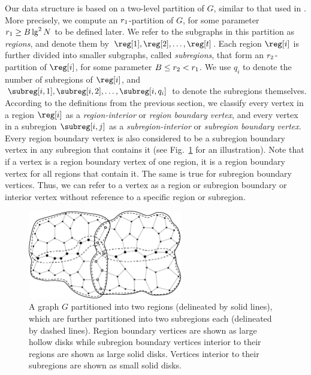 Our data structure is based on a two-level partition of $G$, similar to
that used in \cite{DBLP:journals/talg/BoseCHMM12}.
More precisely, we compute an
$r_1$-partition of $G$, for some parameter $r_1 \ge B \lg^2 N$ to be
defined later.
We refer to the subgraphs in this partition as \emph{regions}, and
denote them by $\reg[1], \reg[2], \dots, \reg[t]$.
Each region $\reg[i]$ is further
divided into smaller subgraphs, called \emph{subregions}, that form
an $r_2$-partition of $\reg[i]$, for some parameter
$B \le r_2 < r_1$.
We use $q_i$ to denote the number of subregions of $\reg[i]$, and $\subreg[i,1],
\subreg[i,2], \dots, \subreg[i,q_i]$ to denote the subregions themselves.
According to the definitions from the previous section, we classify
every vertex in a region $\reg[i]$ as a \emph{region-interior} or
\emph{region boundary vertex}, and every vertex in a subregion
$\subreg[i,j]$ as a \emph{subregion-interior} or \emph{subregion boundary
  vertex}.
Every region boundary vertex is also considered to be a
subregion boundary vertex in any subregion that contains it
(see Fig.~\ref{fig:partitioned_graph} for an illustration).
Note that if a vertex is a region boundary vertex of one region, it is a region
boundary vertex for all regions that contain it.
The same is true for subregion boundary vertices.
Thus, we can refer to a vertex as a region or subregion boundary or interior
vertex without reference to a specific region or subregion.

\begin{figure}[t]
  \centering
  \includegraphics[width=0.6\textwidth]{Fig1}
  \caption[Recursively-partitioned graph]{A graph $G$ partitioned into two 
	regions (delineated by solid lines), which are further partitioned into two 
	subregions each (delineated by dashed lines).
    Region boundary vertices are shown as large hollow disks while subregion 
	boundary vertices interior to their regions are shown as large solid disks.
    Vertices interior to their subregions are shown as small solid disks.}
  \label{fig:partitioned_graph}
\end{figure}

